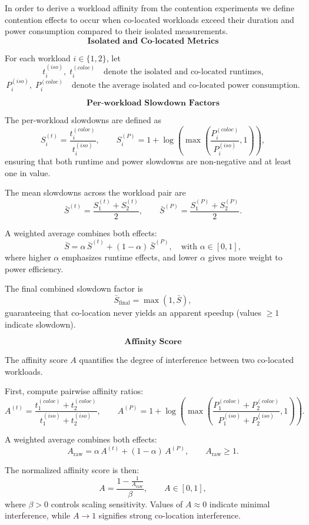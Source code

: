 In order to derive a workload affinity from the contention experiments we define contention effects to occur when co-located workloads exceed their duration and power consumption compared to their isolated measurements.
\[
    \textbf{Isolated and Co-located Metrics}
\]

For each workload \( i \in \{1,2\} \), let
\[
    t_i^{(iso)}, \; t_i^{(coloc)} \quad \text{denote the isolated and co-located runtimes,}
\]
\[
    P_i^{(iso)}, \; P_i^{(coloc)} \quad \text{denote the average isolated and co-located power consumption.}
\]

\[
    \textbf{Per-workload Slowdown Factors}
\]

The per-workload slowdowns are defined as
\[
    S_i^{(t)} = \frac{t_i^{(coloc)}}{t_i^{(iso)}},
    \qquad
    S_i^{(P)} = 1 + \log\!\left(
    \max\!\left( \frac{P_i^{(coloc)}}{P_i^{(iso)}}, 1 \right)
    \right),
\]
ensuring that both runtime and power slowdowns are
non-negative and at least one in value.

The mean slowdowns across the workload pair are
\[
    \bar{S}^{(t)} = \frac{S_1^{(t)} + S_2^{(t)}}{2},
    \qquad
    \bar{S}^{(P)} = \frac{S_1^{(P)} + S_2^{(P)}}{2}.
\]

A weighted average combines both effects:
\[
    \bar{S} =
    \alpha\, \bar{S}^{(t)} + (1 - \alpha)\, \bar{S}^{(P)},
    \quad \text{with } \alpha \in [0,1],
\]
where higher \(\alpha\) emphasizes runtime effects,
and lower \(\alpha\) gives more weight to power efficiency.

The final combined slowdown factor is
\[
    \bar{S}_{\text{final}} = \max(1, \bar{S}),
\]
guaranteeing that co-location never yields an apparent
speedup (values \(\ge 1\) indicate slowdown).

\[
    \textbf{Affinity Score}
\]

The affinity score \(A\) quantifies the degree of
interference between two co-located workloads.

First, compute pairwise affinity ratios:
\[
    A^{(t)} =
    \frac{t_1^{(coloc)} + t_2^{(coloc)}}
    {t_1^{(iso)} + t_2^{(iso)}},
    \qquad
    A^{(P)} =
    1 + \log\!\left(
    \max\!\left(
    \frac{P_1^{(coloc)} + P_2^{(coloc)}}
    {P_1^{(iso)} + P_2^{(iso)}},
    1
    \right)
    \right).
\]

A weighted average combines both effects:
\[
    A_{\text{raw}} =
    \alpha\, A^{(t)} + (1 - \alpha)\, A^{(P)},
    \qquad A_{\text{raw}} \ge 1.
\]

The normalized affinity score is then:
\[
    A =
    \frac{1 - \frac{1}{A_{\text{raw}}}}{\beta},
    \qquad A \in [0, 1],
\]
where \(\beta > 0\) controls scaling sensitivity.
Values of $A \approx 0$ indicate minimal interference,
while \(A \to 1\) signifies strong co-location interference.


